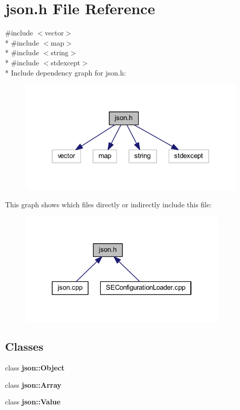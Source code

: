 \section{json.\+h File Reference}
\label{json_8h}
{\ttfamily \#include $<$vector$>$}\\*
{\ttfamily \#include $<$map$>$}\\*
{\ttfamily \#include $<$string$>$}\\*
{\ttfamily \#include $<$stdexcept$>$}\\*
Include dependency graph for json.\+h\+:
\nopagebreak
\begin{figure}[H]
\begin{center}
\leavevmode
\includegraphics[width=312pt]{json_8h__incl}
\end{center}
\end{figure}
This graph shows which files directly or indirectly include this file\+:
\nopagebreak
\begin{figure}[H]
\begin{center}
\leavevmode
\includegraphics[width=286pt]{json_8h__dep__incl}
\end{center}
\end{figure}
\subsection*{Classes}
\begin{DoxyCompactItemize}
\item 
class {\bf json\+::\+Object}
\item 
class {\bf json\+::\+Array}
\item 
class {\bf json\+::\+Value}
\end{DoxyCompactItemize}

